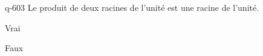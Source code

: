 \begin{truefalse}{q-603}
Le produit de deux racines de l'unité est une racine de l'unité.
\item* Vrai
\item Faux
\end{truefalse}

